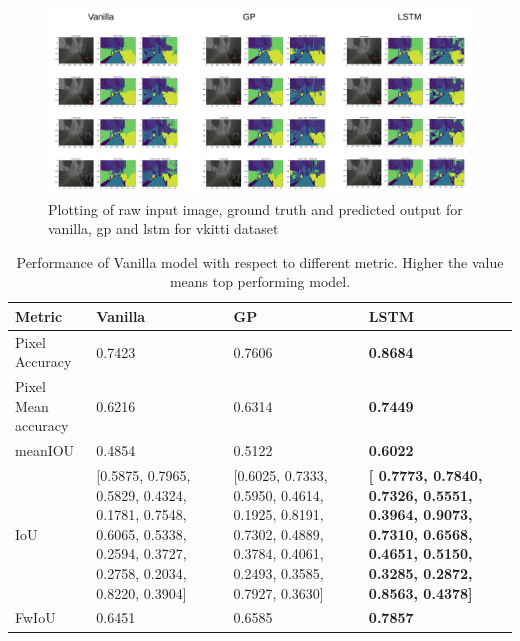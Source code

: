 	\begin{figure}[h]
		\centering
		\includegraphics[width=17cm]{images/unet_vkitti_two.png}
		\caption{Plotting of raw input image, ground truth and predicted output for vanilla, gp and lstm for vkitti dataset}
		\label{fig:vkitti_unet_two}
	\end{figure}

	\begin{table}
		\begin{center}
			\begin{tabular}{ | l | p{4cm} | p{4cm} | p{4cm} |}
				\hline
				
				\cellcolor{purple!30}Metric & \cellcolor{purple!30}Vanilla & \cellcolor{purple!30}GP & \cellcolor{purple!30}LSTM\\ \hline
				
				Pixel Accuracy & 0.7423 & 0.7606 & {\bf 0.8684}  \\ \hline 
				Pixel Mean accuracy & 0.6216 & 0.6314 & { \bf 0.7449} \\ \hline
				meanIOU & 0.4854 & 0.5122 & { \bf 0.6022}  \\ \hline
				IoU & [0.5875, 0.7965,	0.5829,	0.4324,	0.1781,	0.7548,	0.6065,	0.5338,	0.2594,	0.3727,	0.2758,	0.2034,	0.8220,	0.3904] & 
				[0.6025,	0.7333,	0.5950, 0.4614,	0.1925,	0.8191,	0.7302,	0.4889,	0.3784,	0.4061,	0.2493,	0.3585,	0.7927,	0.3630] 
				& { \bf [ 0.7773,	0.7840,	0.7326,	0.5551,	0.3964,	0.9073,	0.7310,	0.6568,	0.4651,	0.5150,	0.3285,	0.2872,	0.8563,	0.4378]} 
				\\ \hline
				FwIoU & 0.6451 & 0.6585 & { \bf 0.7857} \\ \hline
				\hline
			\end{tabular}
			\caption{Performance of Vanilla model with respect to different metric. Higher the value means top performing model.}
			\label{table:unet_vkitti_two_classes}
		\end{center}
	\end{table}
	
